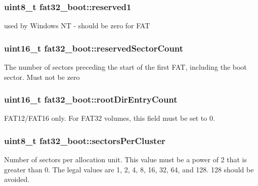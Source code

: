 \subsubsection[{\texorpdfstring{reserved1}{reserved1}}]{\setlength{\rightskip}{0pt plus 5cm}uint8\+\_\+t fat32\+\_\+boot\+::reserved1}\hypertarget{structfat32__boot_a7075c3c00aae071110fd1acb2e6fd599}{}\label{structfat32__boot_a7075c3c00aae071110fd1acb2e6fd599}
used by Windows NT -\/ should be zero for F\+AT 
\subsubsection[{\texorpdfstring{reserved\+Sector\+Count}{reservedSectorCount}}]{\setlength{\rightskip}{0pt plus 5cm}uint16\+\_\+t fat32\+\_\+boot\+::reserved\+Sector\+Count}\hypertarget{structfat32__boot_a8e490f05ad3552dfbdf8f9332d287ba0}{}\label{structfat32__boot_a8e490f05ad3552dfbdf8f9332d287ba0}
The number of sectors preceding the start of the first F\+AT, including the boot sector. Must not be zero 
\subsubsection[{\texorpdfstring{root\+Dir\+Entry\+Count}{rootDirEntryCount}}]{\setlength{\rightskip}{0pt plus 5cm}uint16\+\_\+t fat32\+\_\+boot\+::root\+Dir\+Entry\+Count}\hypertarget{structfat32__boot_a94185496fb56c6e0e8078fc3803e9142}{}\label{structfat32__boot_a94185496fb56c6e0e8078fc3803e9142}
F\+A\+T12/\+F\+A\+T16 only. For F\+A\+T32 volumes, this field must be set to 0. 
\subsubsection[{\texorpdfstring{sectors\+Per\+Cluster}{sectorsPerCluster}}]{\setlength{\rightskip}{0pt plus 5cm}uint8\+\_\+t fat32\+\_\+boot\+::sectors\+Per\+Cluster}\hypertarget{structfat32__boot_a63ded2780732f166f7b7d36bc6aed702}{}\label{structfat32__boot_a63ded2780732f166f7b7d36bc6aed702}
Number of sectors per allocation unit. This value must be a power of 2 that is greater than 0. The legal values are 1, 2, 4, 8, 16, 32, 64, and 128. 128 should be avoided. 

